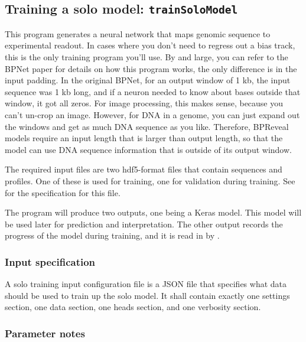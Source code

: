 \documentclass{article}
\begin{document}
\newpage


\subsection{Training a solo model: \texttt{trainSoloModel}}\label{prog:trainSoloModel}

This program generates a neural network that maps genomic sequence to experimental readout.
In cases where you don't need to regress out a bias track, this is the only training program
you'll use.
By and large, you can refer to the BPNet paper for details on how this program works, the only
difference is in the input padding.
In the original BPNet, for an output window of 1 kb, the input sequence was 1 kb long, and if
a neuron needed to know about bases outside that window, it got all zeros.
For image processing, this makes sense, because you can't un-crop an image. However, for DNA in
a genome, you can just expand out the windows and get as much DNA sequence as you like.
Therefore, BPReveal models require an input length that is larger than output length, so that
the model can use DNA sequence information that is outside of its output window.

The required input files are two hdf5-format files that contain sequences and profiles.
One of these is used for training, one for validation during training.
See  for the specification for this file.

The program will produce two outputs, one being a Keras model. This model will be used later
for prediction and interpretation.
The other output records the progress of the model during training, and it is read in
by .


\subsubsection{Input specification}

A solo training input configuration file is a JSON file that specifies what data should
be used to train up the solo model.
It shall contain exactly one settings section, one data section, one heads section,
and one verbosity section.



\subsubsection{Parameter notes}
\end{document}

